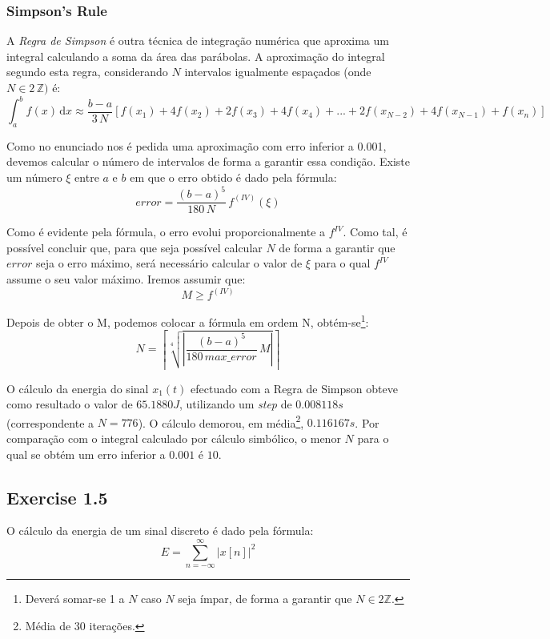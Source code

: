 \documentclass[a4paper]{article}
\begin{document}
\subsubsection{Simpson's Rule}
\noindent A \emph{Regra de Simpson} é outra técnica de integração numérica que aproxima um integral calculando a soma da área das parábolas. A aproximação do integral segundo esta regra, considerando $N$ intervalos igualmente espaçados (onde $N \in 2 \, \mathbb{Z})$ é:
\begin{equation}
\int_{a}^{b} f(x) \, \mathrm{d} x \approx \frac{b-a}{3 \, N} [f(x_{1}) + 4 f(x_{2}) + 2 f(x_{3}) + 4 f(x_{4}) + ... + 2 f(x_{N-2}) + 4 f(x_{N-1}) + f(x_{n})]
\end{equation}

\noindent Como no enunciado nos é pedida uma aproximação com erro inferior a 0.001, devemos calcular o número de intervalos de forma a garantir essa condição. Existe um número $\xi$ entre $a$ e $b$ em que o erro obtido é dado pela fórmula:
\begin{equation}
error = \frac{(b-a)^5}{180 \, N} \, f^{(IV)} (\xi)
\end{equation}

\noindent Como é evidente pela fórmula, o erro evolui proporcionalmente a $f^{IV}$. Como tal, é possível concluir que, para que seja possível calcular $N$ de forma a garantir que $error$ seja o erro máximo, será necessário calcular o valor de $\xi$ para o qual $f^{IV}$ assume o seu valor máximo. Iremos assumir que: 
\begin{equation}
M \ge f^{(IV)}
\end{equation}

\noindent Depois de obter o M, podemos colocar a fórmula em ordem N, obtém-se\footnote{Deverá somar-se 1 a $N$ caso $N$ seja ímpar, de forma a garantir que $N \in 2 \mathbb{Z}.$}:
\begin{equation}
N = \left\lceil \sqrt[4]{\left| \frac{(b - a)^5}{180 \, max\_error} \, M \right|} \right\rceil
\end{equation}

\noindent O cálculo da energia do sinal $x_{1}(t)$ efectuado com a Regra de Simpson obteve como resultado o valor de $65.1880J$, utilizando um \emph{step} de $0.008118s$ (correspondente a $N = 776$). O cálculo demorou, em média\footnote{Média de 30 iterações.}, $0.116167s$. Por comparação com o integral calculado por cálculo simbólico, o menor $N$ para o qual se obtém um erro inferior a $0.001$ é $10$.

\subsection{Exercise 1.5}
\noindent O cálculo da energia de um sinal discreto é dado pela fórmula:
\begin{equation}
E = \sum_{n = -\infty}^{\infty} | x[n] |^2
\end{equation}
\end{document}
